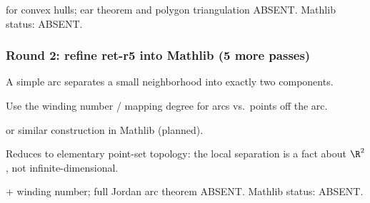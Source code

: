\begin{lemma}
\label{lem:rcs-r10}
 for convex hulls; ear theorem and polygon triangulation ABSENT.  Mathlib status: ABSENT.
\leanok
\end{lemma}

\subsubsection*{Round 2: refine ret-r5 into Mathlib (5 more passes)}

\begin{lemma}
\label{lem:ret-r6}
A simple arc separates a small neighborhood into exactly two components.
\leanok
\end{lemma}

\begin{lemma}
\label{lem:ret-r7}
Use the winding number / mapping degree for arcs vs.\ points off the arc.
\leanok
\end{lemma}

\begin{lemma}
\label{lem:ret-r8}
 or similar construction in Mathlib (planned).
\leanok\mathlibok
\end{lemma}

\begin{lemma}[Pass ret.9: $\pi_{0}(\R^{2}\setminus\text{arc}) = \{2 \text{ components}\}$]
\label{lem:ret-r9}
Reduces to elementary point-set topology: the local separation is a fact about $\R^{2}$, not infinite-dimensional.
\leanok
\end{lemma}

\begin{lemma}
\label{lem:ret-r10}
 + winding number; full Jordan arc theorem ABSENT.  Mathlib status: ABSENT.
\leanok
\end{lemma}

